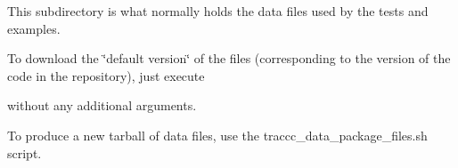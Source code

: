 This subdirectory is what normally holds the data files used by the tests and examples.

To download the \char`\"{}default version\char`\"{} of the files (corresponding to the version of the code in the repository), just execute


\begin{DoxyCode}{0}
\end{DoxyCode}


without any additional arguments.

To produce a new tarball of data files, use the {\ttfamily traccc\+\_\+data\+\_\+package\+\_\+files.\+sh} script. 